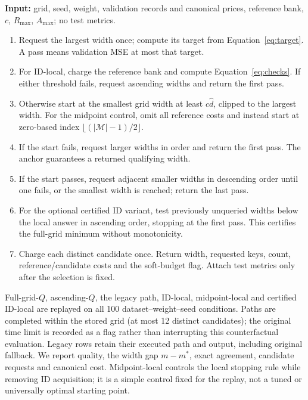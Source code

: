 \documentclass[make,article,submit,pdftex,moreauthors]{Definitions/mdpi}
\begin{document}
\medskip\noindent\begin{minipage}{\linewidth}
\begin{Algorithm}
\label{alg:replay}\normalfont\small\leavevmode\par\noindent
\textbf{Input:} grid, seed, weight, validation records and canonical prices,
reference bank, $c$, $R_{\max}$, $A_{\max}$; no test metrics.
\begin{enumerate}
\item Request the largest width once; compute its target from
Equation~\ref{eq:target}. A pass means validation MSE at most that target.
\item For ID-local, charge the reference bank and compute Equation~\ref{eq:checks}.
If either threshold fails, request ascending widths and return the first pass.
\item Otherwise start at the smallest grid width at least $c\hat d$,
clipped to the largest width. For the midpoint control, omit all reference
costs and instead start at zero-based index $\lfloor(|\mathcal M|-1)/2\rfloor$.
\item If the start fails, request larger widths in order and return the
first pass. The anchor guarantees a returned qualifying width.
\item If the start passes, request adjacent smaller widths in descending
order until one fails, or the smallest width is reached; return the last pass.
\item For the optional certified ID variant, test previously unqueried
widths below the local answer in ascending order, stopping at the first
pass. This certifies the full-grid minimum without monotonicity.
\item Charge each distinct candidate once. Return width, requested keys,
count, reference/candidate costs and the soft-budget flag. Attach test
metrics only after the selection is fixed.
\end{enumerate}
\end{Algorithm}
\end{minipage}\medskip

Full-grid-$Q$, ascending-$Q$, the legacy path, ID-local, midpoint-local
and certified ID-local are replayed on all 100 dataset--weight--seed
conditions. Paths are completed within the stored grid (at most 12
distinct candidates); the original time limit is recorded as a flag
rather than interrupting this counterfactual evaluation. Legacy rows
retain their executed path and output, including original fallback.
We report quality, the width gap $m-m^*$, exact agreement, candidate
requests and canonical cost. Midpoint-local controls the local stopping
rule while removing ID acquisition; it is a simple control fixed for
the replay, not a tuned or universally optimal starting point.
\end{document}
